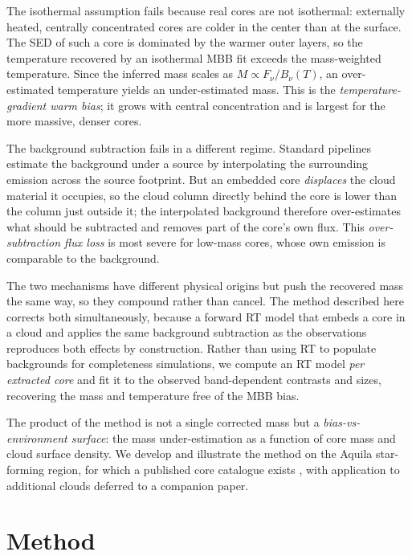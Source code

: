\documentclass[11pt,a4paper]{article}
\begin{document}
The isothermal assumption fails because real cores are not isothermal:
externally heated, centrally concentrated cores are colder in the center
than at the surface. The SED of such a core is dominated by the warmer
outer layers, so the temperature recovered by an isothermal MBB fit
exceeds the mass-weighted temperature. Since the inferred mass scales as
$M \propto F_\nu / B_\nu(T)$, an over-estimated temperature yields an
under-estimated mass. This is the \emph{temperature-gradient warm bias};
it grows with central concentration and is largest for the more massive,
denser cores.

The background subtraction fails in a different regime. Standard pipelines
estimate the background under a source by interpolating the surrounding
emission across the source footprint. But an embedded core \emph{displaces}
the cloud material it occupies, so the cloud column directly behind the core
is lower than the column just outside it; the interpolated background
therefore over-estimates what should be subtracted and removes part of the
core's own flux. This \emph{over-subtraction flux loss} is most severe for
low-mass cores, whose own emission is comparable to the background.

The two mechanisms have different physical origins but push the recovered
mass the same way, so they compound rather than cancel. The method
described here corrects both simultaneously, because a forward RT model
that embeds a core in a cloud and applies the same background subtraction
as the observations reproduces both effects by construction. Rather than
using RT to populate backgrounds for completeness simulations, we compute
an RT model \emph{per extracted core} and fit it to the observed
band-dependent contrasts and sizes, recovering the mass and temperature
free of the MBB bias.

The product of the method is not a single corrected mass but a
\emph{bias-vs-environment surface}: the mass under-estimation as a function
of core mass and cloud surface density. We develop and illustrate the method
on the Aquila star-forming region, for which a published core catalogue exists \citep{Konyves+2015}, with application to additional clouds deferred to a companion paper.

\section{Method}
\end{document}
